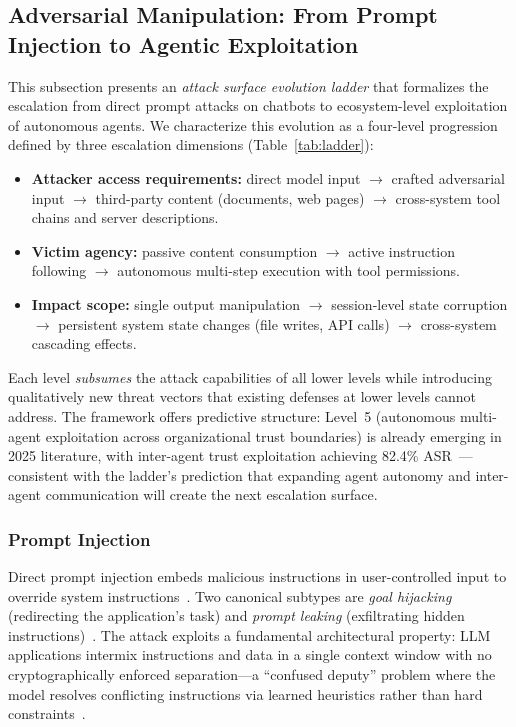 \subsection{Adversarial Manipulation: From Prompt Injection  to Agentic Exploitation}
\label{sec:threat-adversarial}


This subsection presents an \emph{attack surface evolution ladder} that formalizes the escalation from direct prompt attacks on chatbots to ecosystem-level exploitation of autonomous agents. We characterize this evolution as a four-level progression defined by three escalation dimensions (Table~\ref{tab:ladder}):
\begin{itemize}[nosep,leftmargin=1.5em]
    \item \textbf{Attacker access requirements:} direct model input $\to$ crafted adversarial input $\to$ third-party content (documents, web pages) $\to$ cross-system tool chains and server descriptions.
    \item \textbf{Victim agency:} passive content consumption $\to$ active instruction following $\to$ autonomous multi-step execution with tool permissions.
    \item \textbf{Impact scope:} single output manipulation $\to$ session-level state corruption $\to$ persistent system state changes (file writes, API calls) $\to$ cross-system cascading effects.
\end{itemize}
Each level \emph{subsumes} the attack capabilities of all lower levels while introducing qualitatively new threat vectors that existing defenses at lower levels cannot address. The framework offers predictive structure: Level~5 (autonomous multi-agent exploitation across organizational trust boundaries) is already emerging in 2025 literature, with inter-agent trust exploitation achieving 82.4\% ASR~\cite{darkside2025agents}---consistent with the ladder's prediction that expanding agent autonomy and inter-agent communication will create the next escalation surface.



\subsubsection{Prompt Injection}
\label{sec:threat-pi}

Direct prompt injection embeds malicious instructions in user-controlled input to override system instructions~\cite{perez2022ignore}. Two canonical subtypes are \emph{goal hijacking} (redirecting the application's task) and \emph{prompt leaking} (exfiltrating hidden instructions)~\cite{perez2022ignore}. The attack exploits a fundamental architectural property: LLM applications intermix instructions and data in a single context window with no cryptographically enforced separation---a ``confused deputy'' problem where the model resolves conflicting instructions via learned heuristics rather than hard constraints~\cite{greshake2023ipi}.

